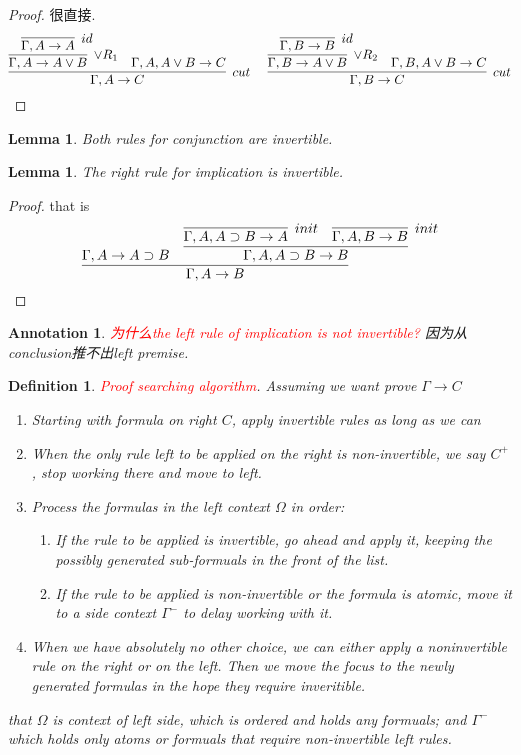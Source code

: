 \documentclass{article}
\theoremstyle{plain}
\newtheorem{lemma}[theorem]{Lemma}
\newtheorem{definition}[theorem]{Definition}
\newtheorem{annotation}[theorem]{Annotation}
\theoremstyle{nonumberplain}
\newtheorem{proof}{Proof}
\newcommand{\redt}[1]{\textcolor{red}{#1}}
\begin{document}
\begin{proof}
\rm 很直接.
$$
\infer[cut]{\Gamma, A \to C}{\infer[\vee R_1]{\Gamma, A \to A \vee B}{\infer[id]{\Gamma,A \to A}{}} & \Gamma, A, A \vee B  \to C} ~~~~ \infer[cut]{\Gamma, B \to C}{\infer[\vee R_2]{\Gamma, B \to A \vee B}{\infer[id]{\Gamma,B \to B}{}} & \Gamma, B,A \vee B \to C}
$$
\end{proof}

\begin{lemma}
\rm Both rules for conjunction are invertible.
\end{lemma}

\begin{lemma}
\rm The right rule for implication is invertible.
\end{lemma}

\begin{proof}
\rm that is
$$
\infer[]{\Gamma, A \to B}{\Gamma, A \to A \supset B & \infer{\Gamma,A, A\supset B \to B}{\infer[init]{\Gamma, A, A \supset B \to A}{} & \infer[init]{\Gamma,A, B \to B}{}}}
$$
\end{proof}

\begin{annotation}
\rm \redt{为什么the left rule of implication is not invertible?} 因为从conclusion推不出left premise. 
\end{annotation}

\begin{definition}
\rm \redt{Proof searching algorithm}. Assuming we want prove $\Gamma \to C$
\begin{enumerate}
	\item Starting with formula on right $C$, apply invertible rules as long as we can
	\item When the only rule left to be applied on the right is non-invertible, we say $C^+$, stop working there and move to left.
	\item Process the formulas in the left context $\Omega$ in order:
	\begin{enumerate}
		\item If the rule to be applied is invertible, go ahead and apply it, keeping the possibly generated sub-formuals in the front of the list.
		\item If the rule to be applied is non-invertible or the formula is atomic, move it to a side context $\Gamma^-$ to delay working with it. 
	\end{enumerate}
	\item When we have absolutely no other choice, we can either apply a noninvertible rule on the right or on the left. Then we move the focus to the newly generated formulas in the hope they require inveritible.
\end{enumerate}
that $\Omega$ is context of left side, which is ordered and holds any formuals; and $\Gamma^-$ which holds only atoms or formuals that require non-invertible left rules.  
\end{definition}
\end{document}
